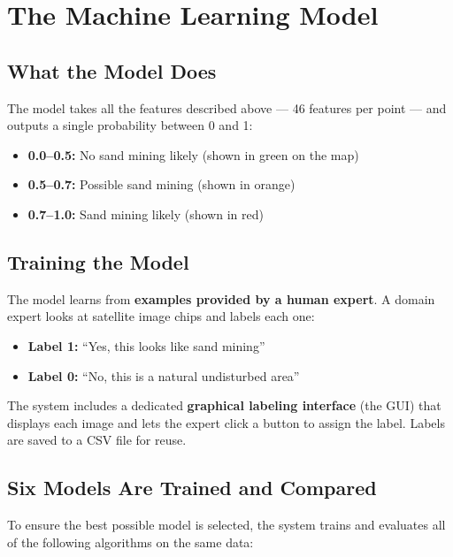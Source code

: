 \documentclass[12pt, a4paper]{article}
\begin{document}
\section{The Machine Learning Model}

\subsection{What the Model Does}

The model takes all the features described above --- 46 features per
point --- and outputs a single probability between 0 and 1:

\begin{itemize}[noitemsep]
  \item \textbf{0.0--0.5:} No sand mining likely (shown in green on the map)
  \item \textbf{0.5--0.7:} Possible sand mining (shown in orange)
  \item \textbf{0.7--1.0:} Sand mining likely (shown in red)
\end{itemize}

\subsection{Training the Model}

The model learns from \textbf{examples provided by a human expert}.
A domain expert looks at satellite image chips and labels each one:
\begin{itemize}[noitemsep]
  \item \textbf{Label 1:} ``Yes, this looks like sand mining''
  \item \textbf{Label 0:} ``No, this is a natural undisturbed area''
\end{itemize}

The system includes a dedicated \textbf{graphical labeling interface}
(the GUI) that displays each image and lets the expert click a button
to assign the label. Labels are saved to a CSV file for reuse.

\subsection{Six Models Are Trained and Compared}

To ensure the best possible model is selected, the system trains and
evaluates all of the following algorithms on the same data:
\end{document}
